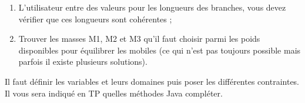 \begin{enumerate}
\item L'utilisateur entre des valeurs pour les longueurs des branches, vous
      devez vérifier que ces longueurs sont cohérentes ;

\item Trouver les masses M1, M2 et M3 qu'il faut choisir parmi les poids
      disponibles pour équilibrer les mobiles (ce qui n'est pas toujours
      possible mais parfois il existe plusieurs solutions).

\end{enumerate}

Il faut définir les variables et leurs domaines puis poser les différentes
contraintes. Il vous sera indiqué en TP quelles méthodes Java compléter.
